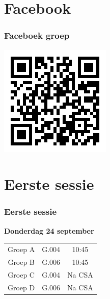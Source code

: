 \section{Facebook}
\begin{frame}
	\frametitle{Faceboek groep}
	\begin{center}
		\includegraphics[scale=0.7]{res/qrfb.png}
	\end{center}
\end{frame}

\section{Eerste sessie}
\begin{frame}
	\frametitle{Eerste sessie}
	\textbf{Donderdag 24 september}\\
	\vspace{1cm}
	
	\begin{center}
	\begin{tabular}{c|c|c}
    Groep A & G.004 & 10:45\\
    Groep B & G.006 & 10:45\\ \hline
    Groep C & G.004 & Na CSA\\
    Groep D & G.006 & Na CSA
    \end{tabular}
	\end{center}
    
\end{frame}







